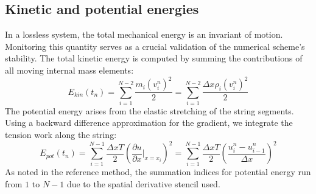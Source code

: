 \documentclass[a4paper,11pt]{article}
\begin{document}
\subsection{Kinetic and potential energies}
In a lossless system, the total mechanical energy is an invariant of motion. Monitoring this quantity serves as a crucial validation of the numerical scheme's stability. The total kinetic energy is computed by summing the contributions of all moving internal mass elements:
\begin{equation}
    E_{kin}(t_n) = \sum_{i=1}^{N-2} \frac{m_i (v_i^n)^2}{2} = \sum_{i=1}^{N-2} \frac{\Delta x \rho_i (v_i^n)^2}{2}
\end{equation}
The potential energy arises from the elastic stretching of the string segments. Using a backward difference approximation for the gradient, we integrate the tension work along the string:
\begin{equation}
    E_{pot}(t_n) = \sum_{i=1}^{N-1} \frac{\Delta x T}{2} \left( \frac{\partial u}{\partial x}\bigg|_{x=x_i} \right)^2 = \sum_{i=1}^{N-1} \frac{\Delta x T}{2} \left( \frac{u_i^n - u_{i-1}^n}{\Delta x} \right)^2
\end{equation}
As noted in the reference method, the summation indices for potential energy run from $1$ to $N-1$ due to the spatial derivative stencil used.
\end{document}
